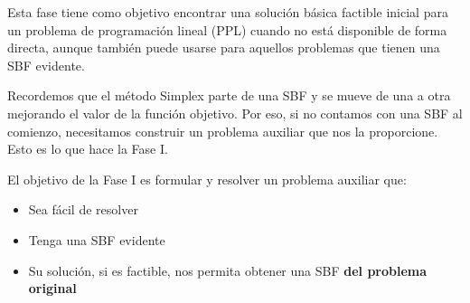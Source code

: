 Esta fase tiene como objetivo encontrar una solución básica factible inicial para un problema de programación lineal (PPL) cuando no está disponible de forma directa, aunque también puede usarse para aquellos problemas que tienen una SBF evidente.

Recordemos que el método Simplex parte de una SBF y se mueve de una a otra mejorando el valor de la función objetivo. Por eso, si no contamos con una SBF al comienzo, necesitamos construir un problema auxiliar que nos la proporcione. Esto es lo que hace la Fase I.

El objetivo de la Fase I es formular y resolver un problema auxiliar que:
\begin{itemize}
  \item Sea fácil de resolver
  \item Tenga una SBF evidente
  \item Su solución, si es factible, nos permita obtener una SBF \textbf{del problema original}
\end{itemize}

